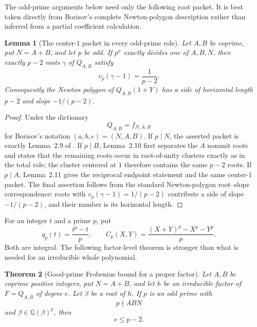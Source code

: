 \documentclass[11pt]{article}
\numberwithin{equation}{section}
\newtheorem{theorem}{Theorem}[section]
\newtheorem{lemma}[theorem]{Lemma}
\theoremstyle{definition}
\newcommand{\Q}{\mathbb Q}
\begin{document}
The odd-prime arguments below need only the following root packet.  It is
best taken directly from Borisov's complete Newton-polygon description rather
than inferred from a partial coefficient calculation.

\begin{lemma}[The center-\(1\) packet in every odd-prime role]
\label{lem:centeroneedge}
Let \(A,B\) be coprime, put \(N=A+B\), and let \(p\) be odd.  If
\(p^\kappa\) exactly divides one of \(A,B,N\), then exactly \(p-2\) roots
\(\gamma\) of \(Q_{A,B}\) satisfy
\[
 v_p(\gamma-1)=\frac1{p-2}.
\]
Consequently the Newton polygon of \(Q_{A,B}(1+Y)\) has a side of
horizontal length \(p-2\) and slope \(-1/(p-2)\).
\end{lemma}

\begin{proof}
Under the dictionary
\[
 Q_{A,B}=f_{N,A,B}
\]
for Borisov's notation \((a,b,c)=(N,A,B)\).  If \(p\mid N\), the asserted
packet is exactly Lemma~2.9 of \cite{Borisov1998}.  If \(p\mid B\),
Lemma~2.10 first separates the \(A\) nonunit roots and states that the
remaining roots occur in root-of-unity clusters exactly as in the total role;
the cluster centered at \(1\) therefore contains the same \(p-2\) roots.
If \(p\mid A\), Lemma~2.11 gives the reciprocal endpoint statement and the
same center-\(1\) packet.  The final assertion follows from the standard
Newton-polygon root--slope correspondence: roots with
\(v_p(\gamma-1)=1/(p-2)\) contribute a side of slope \(-1/(p-2)\), and
their number is its horizontal length.
\end{proof}

For an integer \(t\) and a prime \(p\), put
\[
 q_p(t)=\frac{t^p-t}{p},
 \qquad
 C_p(X,Y)=\frac{(X+Y)^p-X^p-Y^p}{p}.
\]
Both are integral.  The following factor-level theorem is stronger than what
is needed for an irreducible whole polynomial.

\begin{theorem}[Good-prime Frobenius bound for a proper factor]
\label{thm:frobeniusfactor}
Let \(A,B\) be coprime positive integers, put \(N=A+B\), and let \(h\) be
an irreducible factor of \(F=Q_{A,B}\) of degree \(e\).  Let \(\beta\) be
a root of \(h\).  If \(p\) is an odd prime with
\[
 p\nmid ABN
\]
and \(\beta\in\Q(\beta)^p\), then
\begin{equation}
 e\leq p-2.
 \label{eq:14-3}
\end{equation}
\end{theorem}
\end{document}
